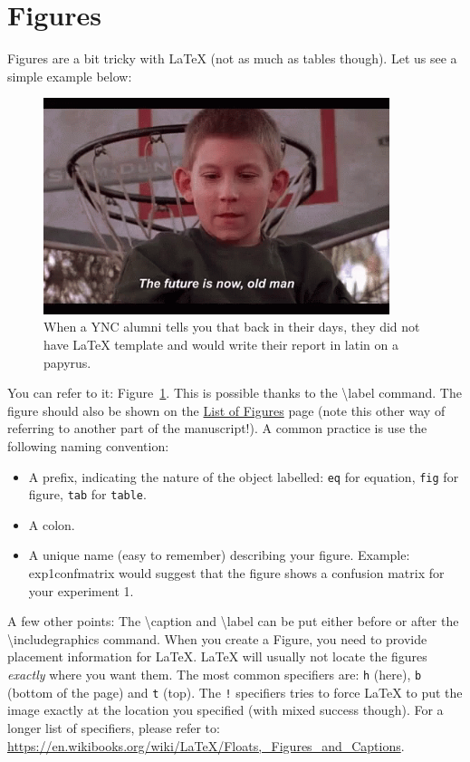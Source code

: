 \section{Figures}
Figures are a bit tricky with LaTeX {\tiny(not as much as tables though)}.
Let us see a simple example below:
\begin{figure}[!h]
  \centering
    \includegraphics[width=0.9\textwidth]{figures/future.png}
  \caption{When a YNC alumni tells you that back in their days, they did not have LaTeX template and would write their report in latin on a papyrus.}
  \label{fig:future}
\end{figure}
You can refer to it: Figure~\ref{fig:future}.
This is possible thanks to the \textbackslash{}label command.
The figure should also be shown on the \hyperref[lst:figs]{List of Figures} page (note this other way of referring to another part of the manuscript!).
A common practice is use the following naming convention:
\begin{itemize}
  \item A prefix, indicating the nature of the object labelled: \texttt{eq} for equation, \texttt{fig} for figure, \texttt{tab} for \texttt{table}.
  \item A colon.
  \item A unique name (easy to remember) describing your figure. Example: exp1confmatrix would suggest that the figure shows a confusion matrix for your experiment 1.
\end{itemize}

A few other points: The \textbackslash{}caption and \textbackslash{}label can be put either before or after the \textbackslash{}includegraphics command.
When you create a Figure, you need to provide placement information for LaTeX. LaTeX will usually not locate the figures \emph{exactly} where you want them.
The most common specifiers are: \texttt{h} (here), \texttt{b} (bottom of the page) and \texttt{t} (top). The \texttt{!} specifiers tries to force LaTeX to put the image exactly at the location you specified (with mixed success though).
For a longer list of specifiers, please refer to: \url{https://en.wikibooks.org/wiki/LaTeX/Floats,_Figures_and_Captions}.

